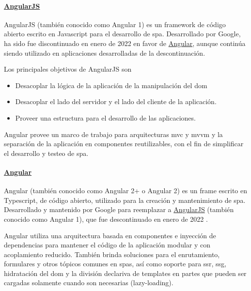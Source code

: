 \paragraph{\href{https://angularjs.org/}{AngularJS}} 
AngularJS (también conocido como Angular 1) es un framework de código abierto escrito en Javascript para el desarrollo de \acrfull{spa}. Desarrollado por Google, ha sido fue discontinuado en enero de 2022 \cite{angularJSDiscontinued} en favor de \href{https://angular.dev/}{Angular}, aunque continúa siendo utilizado en aplicaciones desarrolladas de la descontinuación. 

Los principales objetivos de AngularJS son
\begin{itemize}
    \item Desacoplar la lógica de la aplicación de la manipulación del \acrfull{dom}
    \item Desacoplar el lado del servidor y el lado del cliente de la aplicación.
    \item Proveer una estructura para el desarrollo de las aplicaciones.
\end{itemize}

Angular provee un marco de trabajo para arquitecturas \acrshort{mvc} y \acrfull{mvvm} y la separación de la aplicación en componentes reutilizables, con el fin de simplificar el desarrollo y testeo de \acrshort{spa}.

\paragraph{\href{https://angular.dev/}{Angular}}
Angular (también conocido como Angular 2+ o Angular 2) es un frame escrito en Typescript, de código abierto, utilizado para la creación y mantenimiento de \acrfull{spa}. Desarrollado y mantenido por Google para reemplazar a \href{https://angularjs.org/}{AngularJS} (también conocido como Angular 1), que fue descontinuado en enero de 2022 \cite{angularJSDiscontinued}.

Angular utiliza una arquitectura basada en componentes e inyección de dependencias para mantener el código de la aplicación modular y con acoplamiento reducido. También brinda soluciones para el enrutamiento, formulares y otros tópicos comunes en \acrshort{spa}s, así como soporte para \acrfull{ssr}, \acrfull{ssg}, hidratación del \acrshort{dom} y la división declariva de templates en partes que pueden ser cargadas solamente cuando son necesarias (lazy-loading).

